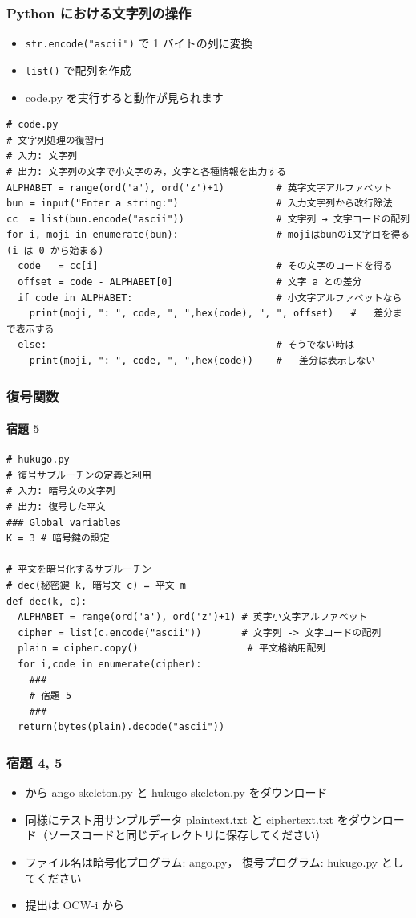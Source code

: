 \begin{frame}
\frametitle{Python における文字列の操作}
  \begin{itemize}
\item {\tt str.encode("ascii")} で 1 バイトの列に変換
\item {\tt list()} で配列を作成
\item code.py を実行すると動作が見られます
  \end{itemize}
  \begin{lstlisting}[caption={code.py},label=lst:code]
# code.py
# 文字列処理の復習用
# 入力: 文字列
# 出力: 文字列の文字で小文字のみ，文字と各種情報を出力する
ALPHABET = range(ord('a'), ord('z')+1)         # 英字文字アルファベット
bun = input("Enter a string:")                 # 入力文字列から改行除法
cc  = list(bun.encode("ascii"))                # 文字列 → 文字コードの配列
for i, moji in enumerate(bun):                 # mojiはbunのi文字目を得る (i は 0 から始まる)
  code   = cc[i]                               # その文字のコードを得る
  offset = code - ALPHABET[0]                  # 文字 a との差分
  if code in ALPHABET:                         # 小文字アルファベットなら
    print(moji, ": ", code, ", ",hex(code), ", ", offset)   #   差分まで表示する
  else:                                        # そうでない時は
    print(moji, ": ", code, ", ",hex(code))    #   差分は表示しない
  \end{lstlisting}
\end{frame}
\begin{frame}
\frametitle{復号関数}
\framesubtitle{宿題 5}
  \begin{lstlisting}[caption={hukugo.py},label=lst:hukugo]
# hukugo.py
# 復号サブルーチンの定義と利用
# 入力: 暗号文の文字列
# 出力: 復号した平文
### Global variables
K = 3 # 暗号鍵の設定

# 平文を暗号化するサブルーチン
# dec(秘密鍵 k, 暗号文 c) = 平文 m
def dec(k, c):
  ALPHABET = range(ord('a'), ord('z')+1) # 英字小文字アルファベット
  cipher = list(c.encode("ascii"))       # 文字列 -> 文字コードの配列
  plain = cipher.copy()                   # 平文格納用配列
  for i,code in enumerate(cipher):
    ###
    # 宿題 5
    ###
  return(bytes(plain).decode("ascii"))
  \end{lstlisting}
\end{frame}
\begin{frame}
\frametitle{宿題 4, 5}
  \begin{itemize}
\item \href{https://sites.google.com/a/presystems.xyz/sample/home/elementary-computer-science}{}から ango-skeleton.py と hukugo-skeleton.py をダウンロード
\item 同様にテスト用サンプルデータ plaintext.txt と ciphertext.txt をダウンロード（ソースコードと同じディレクトリに保存してください）
\item ファイル名は暗号化プログラム: ango.py， 復号プログラム: hukugo.py としてください
\item 提出は OCW-i から
  \end{itemize}
\end{frame}
